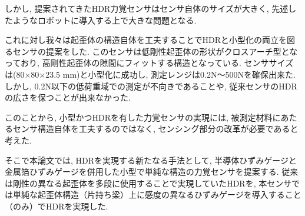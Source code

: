 しかし, 提案されてきたHDR力覚センサはセンサ自体のサイズが大きく, 
先述したようなロボットに導入する上で大きな問題となる.

これに対し我々は起歪体の構造自体を工夫することでHDRと小型化の両立を図るセンサ\cite{Ryuya}の提案をした. 
このセンサは低剛性起歪体の形状がクロスアーチ型となっており, 
高剛性起歪体の隙間にフィットする構造となっている. 
センササイズは(80×80×23.5 mm)と小型化に成功し, 
測定レンジは0.2N～500Nを確保出来た.
しかし, 0.2N以下の低荷重域での測定が不向きであることや, 
従来センサのHDRの広さを保つことが出来なかった. 


このことから, 小型かつHDRを有した力覚センサの実現には, 
被測定材料にあたるセンサ構造自体を工夫するのではなく, 
センシング部分の改革が必要であると考えた. 

そこで本論文では, HDRを実現する新たなる手法として, 半導体ひずみゲージと
金属箔ひずみゲージを併用した小型で単純な構造の力覚センサを提案する. 
従来は剛性の異なる起歪体を多段に使用することで実現していたHDRを, 
本センサでは単純な起歪体構造（片持ち梁）上に感度の異なるひずみゲージを導入すること（のみ）でHDRを実現した. 

